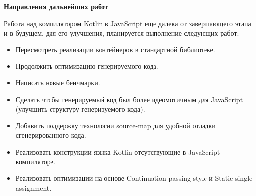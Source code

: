 \null
\begin{LARGE}
\begin{center}
\textbf{Направления дальнейших работ}
\end{center}
\end{LARGE}

Работа над компилятором Kotlin в JavaScript еще далека от завершающего этапа и в будущем, для его улучшения, планируется выполнение следующих работ:
\begin{itemize}
\item Пересмотреть реализации контейнеров в стандартной библиотеке.
\item Продолжить оптимизацию генерируемого кода.
\item Написать новые бенчмарки. 
\item Сделать чтобы генерируемый код был более идеомотичным для JavaScript (улучшить структуру генерируемого кода).
\item Добавить поддержку технологии source-map для удобной отладки сгенерированного кода.
\item Реализовать конструкции языка Kotlin отсутствующие в JavaScript компиляторе.
\item Реализовать оптимизации на основе Continuation-passing style и 
Static single assignment.
\end{itemize}